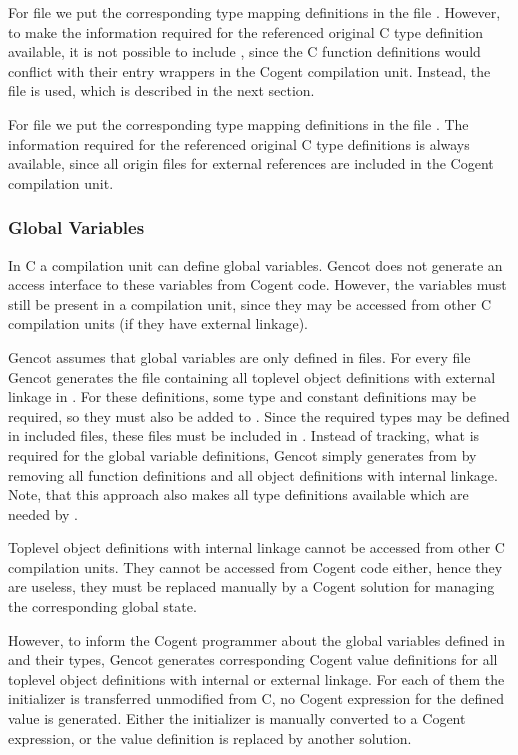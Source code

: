 For file  we put the corresponding
type mapping definitions in the file . However, to make the information required for the 
referenced original C type definition
available, it is not possible to include , since the C function definitions would conflict with their
entry wrappers in the Cogent compilation unit. Instead, the file  is used, which is described in the
next section.

For file  we put the corresponding
type mapping definitions in the file . The information required for the referenced original C type
definitions is always available, since all origin files for external references are included in the Cogent compilation unit.

\subsubsection{Global Variables}

In C a compilation unit can define global variables. Gencot does not generate an access interface to these variables
from Cogent code. However, the variables must still be present in a compilation unit, since they may be accessed
from other C compilation units (if they have external linkage). 

Gencot assumes that global variables are only defined in  files. For every file  Gencot generates
the file  containing all toplevel object definitions with external linkage in . For 
these definitions, some type and constant definitions may be required, so they must also be added to .
Since the required types may be defined in included  files, these files must be included in .
Instead of tracking, what is required for the global variable definitions, Gencot simply generates 
from  by removing all function definitions and all object definitions with internal linkage. Note, that
this approach also makes all type definitions available which are needed by .

Toplevel object definitions with internal linkage cannot be accessed from other C compilation units. They cannot be
accessed from Cogent code either, hence they are useless, they must be replaced manually by a Cogent solution for
managing the corresponding global state. 

However, to inform the Cogent programmer about the global variables defined in  and their types, Gencot 
generates corresponding Cogent value definitions for all toplevel object definitions with internal or external linkage. 
For each of them the initializer is transferred unmodified from C, no Cogent expression for the defined value is 
generated. Either the initializer is manually converted to a Cogent expression, or the value definition is replaced
by another solution. 

